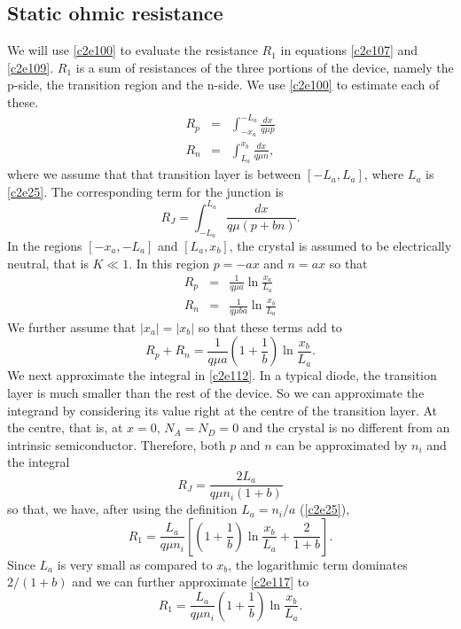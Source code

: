 \subsection{Static ohmic resistance}
We will use \eqref{c2e100} to evaluate the resistance $R_1$ in equations 
\eqref{c2e107} and \eqref{c2e109}. $R_1$ is a sum of resistances of the three
portions of the device, namely the p-side, the transition region and the n-side.
We use \eqref{c2e100} to estimate each of these.
\begin{eqnarray}
{R_p} &=& \int_{-x_a}^{-L_a}\frac{dx}{q\mu p} \label{c2e110} \\
{R_n} &=& \int_{L_a}^{x_b}\frac{dx}{q\mu n}, \label{c2e111}
\end{eqnarray}
where we assume that that transition layer is between $[-L_a, L_a]$, where $L_a$
is \eqref{c2e25}. The corresponding term for the junction is
\begin{equation}\label{c2e112}
R_J = \int_{-L_a}^{L_a}\frac{dx}{q\mu(p + bn)}.
\end{equation}
In the regions $[-x_a, -L_a]$ and $[L_a, x_b]$, the crystal is assumed to be
electrically neutral, that is $K \ll 1$. In this region $p = -ax$ and $n = ax$
so that
\begin{eqnarray}
{R_p} &=& \frac{1}{q\mu a}\ln\frac{x_a}{L_a} \label{c2e113} \\
{R_n} &=& \frac{1}{q\mu ba}\ln\frac{x_b}{L_a} \label{c2e114}
\end{eqnarray}
We further assume that $|x_a| = |x_b|$ so that these terms add to
\begin{equation}\label{c2e115}
{R_p} + {R_n} = \frac{1}{q\mu a}\left(1 + \frac{1}{b}\right)
\ln\frac{x_b}{L_a}.
\end{equation}
We next approximate the integral in \eqref{c2e112}. In a typical diode, the
transition layer is much smaller than the rest of the device. So we can 
approximate the integrand by considering its value right at the centre of the
transition layer. At the centre, that is, at $x = 0$, $N_A = N_D = 0$ and the
crystal is no different from an intrinsic semiconductor. Therefore, both $p$
and $n$ can be approximated by $n_i$ and the integral 
\begin{equation}\label{c2e116}
R_J = \frac{2L_a}{q\mu n_i(1 + b)}
\end{equation}
so that, we have, after using the definition $L_a = n_i/a$ (\eqref{c2e25}),
\begin{equation}\label{c2e117}
R_1 = \frac{L_a}{q\mu n_i}\left[\left(1 + \frac{1}{b}\right)
\ln\frac{x_b}{L_a} + \frac{2}{1 + b}\right].
\end{equation}
Since $L_a$ is very small as compared to $x_b$, the logarithmic term dominates
$2/(1 + b)$ and we can further approximate \eqref{c2e117} to
\begin{equation}\label{c2e118}
R_1 = \frac{L_a}{q\mu n_i}\left(1 + \frac{1}{b}\right)\ln\frac{x_b}{L_a}.
\end{equation}

